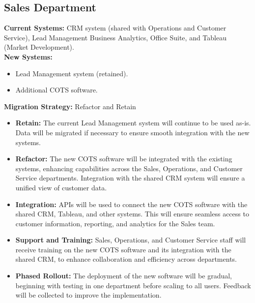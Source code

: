 \subsection{Sales Department}
\textbf{Current Systems:} CRM system (shared with Operations and Customer Service), Lead Management Business Analytics, Office Suite, and Tableau (Market Development). \\
\textbf{New Systems:}
\begin{itemize}
    \item Lead Management system (retained).
    \item Additional COTS software.
\end{itemize}
\textbf{Migration Strategy:} Refactor and Retain
\begin{itemize}
    \item \textbf{Retain:} The current Lead Management system will continue to be used as-is. Data will be migrated if necessary to ensure smooth integration with the new systems.
    \item \textbf{Refactor:} The new COTS software will be integrated with the existing systems, enhancing capabilities across the Sales, Operations, and Customer Service departments. Integration with the shared CRM system will ensure a unified view of customer data.
    \item \textbf{Integration:} APIs will be used to connect the new COTS software with the shared CRM, Tableau, and other systems. This will ensure seamless access to customer information, reporting, and analytics for the Sales team.
    \item \textbf{Support and Training:} Sales, Operations, and Customer Service staff will receive training on the new COTS software and its integration with the shared CRM, to enhance collaboration and efficiency across departments.
    \item \textbf{Phased Rollout:} The deployment of the new software will be gradual, beginning with testing in one department before scaling to all users. Feedback will be collected to improve the implementation.
\end{itemize}



